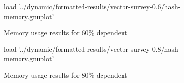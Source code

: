 \begin{figure}[H]
	\centering
	\begin{gnuplot}[terminal=pdf]
	load '../dynamic/formatted-results/vector-survey-0.6/hash-memory.gnuplot'
	\end{gnuplot}
	\caption{Memory usage results for 60\% dependent}
	\label{chart:memory-0.6-hash}
\end{figure}

\begin{figure}[H]
	\centering
	\begin{gnuplot}[terminal=pdf]
	load '../dynamic/formatted-results/vector-survey-0.8/hash-memory.gnuplot'
	\end{gnuplot}
	\caption{Memory usage results for 80\% dependent}
	\label{chart:memory-0.8-hash}
\end{figure}